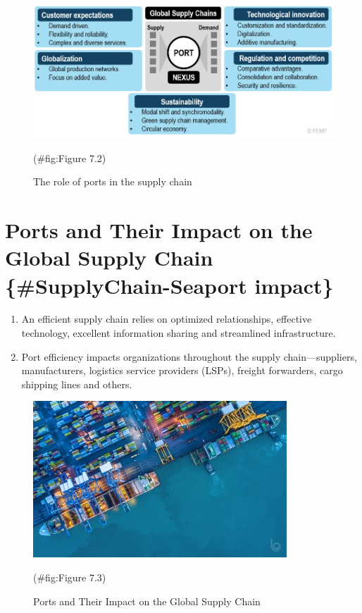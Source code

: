 \documentclass[
]{book}
\providecommand{\tightlist}{%
  \setlength{\itemsep}{0pt}\setlength{\parskip}{0pt}}
\begin{document}
\begin{figure}

{\centering \includegraphics{./Images/supplychain/The role of ports in the supply chain} 

}

\caption{The role of ports in the supply chain}(\#fig:Figure 7.2)
\end{figure}

\hypertarget{ports-and-their-impact-on-the-global-supply-chain-supplychain-seaport-impact}{%
\section{Ports and Their Impact on the Global Supply Chain \{\#SupplyChain-Seaport impact\}}\label{ports-and-their-impact-on-the-global-supply-chain-supplychain-seaport-impact}}

\begin{enumerate}
\def\labelenumi{\arabic{enumi}.}
\tightlist
\item
  An efficient supply chain relies on optimized relationships, effective technology, excellent information sharing and streamlined infrastructure.
\item
  Port efficiency impacts organizations throughout the supply chain---suppliers, manufacturers, logistics service providers (LSPs), freight forwarders, cargo shipping lines and others.
\end{enumerate}

\begin{figure}

{\centering \includegraphics{./Images/supplychain/Ports and Their Impact on the Global Supply Chain} 

}

\caption{Ports and Their Impact on the Global Supply Chain}(\#fig:Figure 7.3)
\end{figure}
\end{document}
